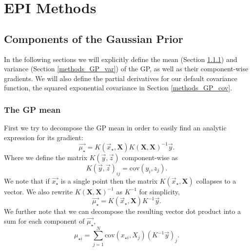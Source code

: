 \documentclass[phd,tocprelim]{cornell}
\begin{document}

\chapter{EPI Methods} %
\label{cha:EPI Methods}

\section{Components of the Gaussian Prior}

In the following sections we will explicitly define the mean (Section \ref{methods_GP_mean}) and variance (Section \ref{methods_GP_var}) of the GP, as well as their component-wise gradients. We will also define the partial derivatives for our default covariance function, the squared exponential covariance in Section \ref{methods_GP_cov}.

\subsection{The GP mean}
\label{methods_GP_mean}

First we try to decompose the GP mean in order to easily find an analytic expression for its gradient:
\begin{equation}
 \vec{\mu_{\star}} = K(\vec{x}_{\star}, \textbf{X} )K(\textbf{X},\textbf{X})^{-1}\vec{y}.
\end{equation}
Where we define the matrix $K(\vec{y}, \vec{z})$ component-wise as
\begin{equation}
 K(\vec{y}, \vec{z})_{ij} = \mbox{cov}(y_{i}, z_{j}).
\end{equation}
We note that if $\vec{x_{\star}}$ is a single point then the matrix $K(\vec{x}_{\star}, \textbf{X} )$ collapses to a vector. We also rewrite $K(\textbf{X},\textbf{X})^{-1}$ as $K^{-1}$ for simplicity,
\begin{equation}
 \vec{\mu_{\star}} = K(\vec{x}_{\star}, \textbf{X} ) K^{-1} \vec{y}.
\end{equation}
We further note that we can decompose the resulting vector dot product into a sum for each component of $\vec{\mu_{\star}}$,
\begin{equation}
 \mu_{\star {i}} = \sum_{j = 1}^{N} \mbox{cov}(x_{\star i}, X_{j}) \left(K^{-1} \vec{y} \right)_{j}.
\end{equation}
\end{document}
